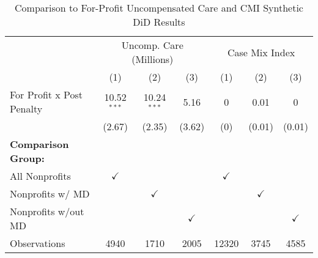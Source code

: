 \begin{table}[ht!]

\caption{\label{tab:forprofit_uncompCMI_synth} Comparison to For-Profit Uncompensated Care and CMI Synthetic DiD Results}
\centering
\begin{tabular}[t]{lcccccc}
\toprule
\multicolumn{1}{c}{ } & \multicolumn{3}{c}{Uncomp. Care (Millions)} & \multicolumn{3}{c}{Case Mix Index} \\
\cmidrule(l{3pt}r{3pt}){2-4} \cmidrule(l{3pt}r{3pt}){5-7}
 & (1) & (2) & (3) & (1) & (2) & (3)\\
\midrule
For Profit x Post Penalty & 10.52$^{***}$ & 10.24$^{***}$ & 5.16 & 0 & 0.01 & 0\\
 & (2.67) & (2.35) & (3.62) & (0) & (0.01) & (0.01)\\
\textbf{Comparison Group:} &  &  &  &  &  & \\
All Nonprofits & $\checkmark$ &  &  & $\checkmark$ &  & \\
Nonprofits w/ MD &  & $\checkmark$ &  &  & $\checkmark$ & \\
\addlinespace
Nonprofits w/out MD &  &  & $\checkmark$ &  &  & $\checkmark$\\
Observations & 4940 & 1710 & 2005 & 12320 & 3745 & 4585\\
\bottomrule
\end{tabular}
\end{table}
